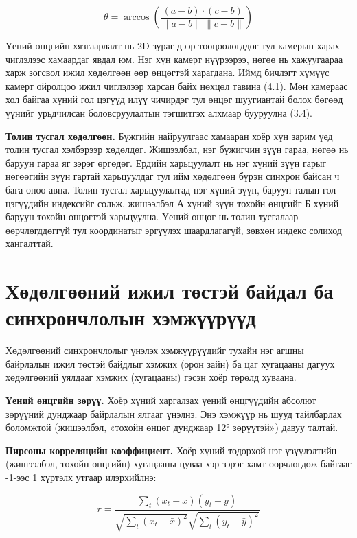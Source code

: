 \begin{equation}
\theta = \arccos \left( \frac{(a - b) \cdot (c - b)}{\|a - b\| \, \|c - b\|} \right)
\end{equation}

Үений өнцгийн хязгаарлалт нь 2D зураг дээр тооцоологддог тул камерын харах чиглэлээс хамаардаг явдал юм. Нэг хүн камерт нүүрээрээ, нөгөө нь хажуугаараа харж зогсвол ижил хөдөлгөөн өөр өнцөгтэй харагдана. Иймд бичлэгт хүмүүс камерт ойролцоо ижил чиглэлээр харсан байх нөхцөл тавина (4.1). Мөн камераас хол байгаа хүний гол цэгүүд илүү чичирдэг тул өнцөг шуугиантай болох бөгөөд үүнийг урьдчилсан боловсруулалтын тэгшитгэх алхмаар бууруулна (3.4).

\textbf{Толин тусгал хөдөлгөөн.} Бүжгийн найруулгаас хамааран хоёр хүн зарим үед толин тусгал хэлбэрээр хөдөлдөг. Жишээлбэл, нэг бүжигчин зүүн гараа, нөгөө нь баруун гараа яг зэрэг өргөдөг. Ердийн харьцуулалт нь нэг хүний зүүн гарыг нөгөөгийн зүүн гартай харьцуулдаг тул ийм хөдөлгөөн бүрэн синхрон байсан ч бага оноо авна. Толин тусгал харьцуулалтад нэг хүний зүүн, баруун талын гол цэгүүдийн индексийг сольж, жишээлбэл А хүний зүүн тохойн өнцгийг Б хүний баруун тохойн өнцөгтэй харьцуулна. Үений өнцөг нь толин тусгалаар өөрчлөгддөггүй тул координатыг эргүүлэх шаардлагагүй, зөвхөн индекс солиход хангалттай.

\section[Ижил төстэй байдал ба синхрончлолын хэмжүүрүүд]{Хөдөлгөөний ижил төстэй байдал ба синхрончлолын хэмжүүрүүд}

Хөдөлгөөний синхрончлолыг үнэлэх хэмжүүрүүдийг тухайн нэг агшны байрлалын ижил төстэй байдлыг хэмжих (орон зайн) ба цаг хугацааны дагуух хөдөлгөөний уялдааг хэмжих (хугацааны) гэсэн хоёр төрөлд хуваана.

\textbf{Үений өнцгийн зөрүү.} Хоёр хүний харгалзах үений өнцгүүдийн абсолют зөрүүний дунджаар байрлалын ялгааг үнэлнэ. Энэ хэмжүүр нь шууд тайлбарлах боломжтой (жишээлбэл, «тохойн өнцөг дунджаар 12° зөрүүтэй») давуу талтай.

\textbf{Пирсоны корреляцийн коэффициент.} Хоёр хүний тодорхой нэг үзүүлэлтийн (жишээлбэл, тохойн өнцгийн) хугацааны цуваа хэр зэрэг хамт өөрчлөгдөж байгааг -1-ээс 1 хүртэлх утгаар илэрхийлнэ:

\begin{equation}
r = \frac{\sum_{t} (x_t - \bar{x})(y_t - \bar{y})}{\sqrt{\sum_{t} (x_t - \bar{x})^2} \sqrt{\sum_{t} (y_t - \bar{y})^2}}
\end{equation}

